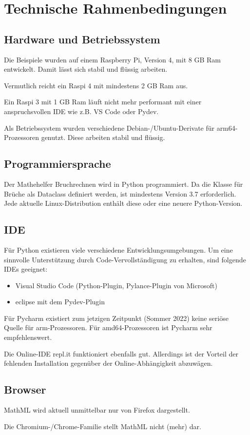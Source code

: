 \section{Technische Rahmenbedingungen}

\subsection{Hardware und Betriebssystem}

Die Beispiele wurden auf einem Raspberry Pi, Version 4, mit 8 GB Ram entwickelt. Damit lässt sich stabil und flüssig arbeiten.

Vermutlich reicht ein Raspi 4 mit mindestens 2 GB Ram aus.

Ein Raspi 3 mit 1 GB Ram läuft nicht mehr performant mit einer anspruchsvollen IDE wie z.B. VS Code oder Pydev.

Als Betriebssystem wurden verschiedene Debian-/Ubuntu-Derivate für arm64-Prozessoren genutzt. Diese arbeiten stabil und flüssig.

\subsection{Programmiersprache}

Der Mathehelfer Bruchrechnen wird in Python programmiert. Da die Klasse für Brüche als Dataclass definiert werden, ist mindestens Version 3.7 erforderlich. Jede aktuelle Linux-Distribution enthält diese oder eine neuere Python-Version.

\subsection{IDE}

Für Python existieren viele verschiedene Entwicklungsumgebungen. Um eine sinnvolle Unterstützung durch Code-Vervollständigung zu erhalten, sind folgende IDEs geeignet:
\begin{itemize}
	\item Visual Studio Code (Python-Plugin, Pylance-Plugin von Microsoft)
	\item eclipse mit dem Pydev-Plugin
\end{itemize}

Für Pycharm existiert zum jetzigen Zeitpunkt (Sommer 2022) keine seriöse Quelle für arm-Prozessoren. Für amd64-Prozessoren ist Pycharm sehr empfehlenswert.

Die Online-IDE repl.it funktioniert ebenfalls gut. Allerdings ist der Vorteil der fehlenden Installation gegenüber der Online-Abhängigkeit abzuwägen.

\subsection{Browser}

MathML wird aktuell unmittelbar nur von Firefox dargestellt.

Die Chromium-/Chrome-Familie stellt MathML nicht (mehr)  dar.